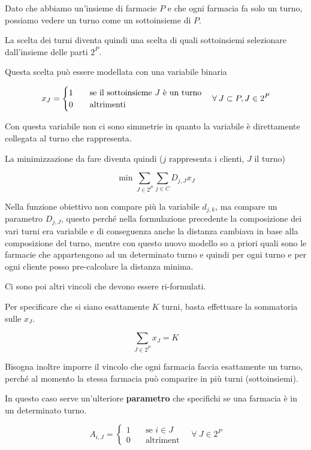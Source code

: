 Dato che abbiamo un'insieme di farmacie $P$ e che ogni farmacia fa solo un turno, possiamo vedere un turno come un sottoinsieme di $P$.

La scelta dei turni diventa quindi una scelta di quali sottoinsiemi selezionare dall'insieme delle parti $2^P$.

Questa scelta può essere modellata con una variabile binaria

$$
x_J = \begin{cases}
1 \quad& \text{se il sottoinsieme \textit{J} è un turno} \\
0 \quad&\text{altrimenti}
\end{cases} \quad \forall \: J \subset P, J \in 2^P
$$

\noindent Con questa variabile non ci sono simmetrie in quanto la variabile è direttamente collegata al turno che rappresenta.

La minimizzazione da fare diventa quindi ($j$ rappresenta i clienti, $J$ il turno)

$$
\min \sum\limits_{J \in 2^P} \sum\limits_{j \in C} D_{j,J}x_J
$$

\noindent Nella funzione obiettivo non compare più la variabile $d_{j,k}$, ma compare un parametro $D_{j,J}$, questo perché nella formulazione precedente la composizione dei vari turni era variabile e di conseguenza anche la distanza cambiava in base alla composizione del turno, mentre con questo nuovo modello so a priori quali sono le farmacie che appartengono ad un determinato turno e quindi per ogni turno e per ogni cliente posso pre-calcolare la distanza minima.

Ci sono poi altri vincoli che devono essere ri-formulati.

Per specificare che si siano esattamente $K$ turni, basta effettuare la sommatoria sulle $x_J$.

$$
\sum\limits_{J \in 2^P} x_J = K
$$

\noindent Bisogna inoltre imporre il vincolo che ogni farmacia faccia esattamente un turno, perché al momento la stessa farmacia può comparire in più turni (sottoinsiemi).

In questo caso serve un'ulteriore \textbf{parametro} che specifichi se una farmacia è in un determinato turno.

$$
A_{i,J} = \begin{cases}
1 \quad &\text{se } i \in J \\
0 \quad &\text{altriment}
\end{cases} \quad \forall \: J \in 2^P
$$

